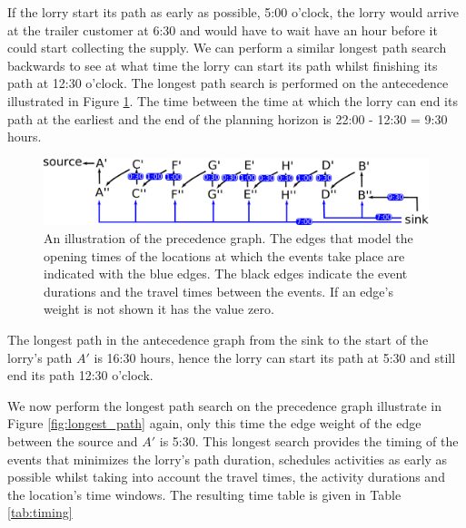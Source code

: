 If the lorry start its path as early as possible, 5:00 o'clock, the lorry would arrive at the trailer customer at 6:30 and would have to wait have an hour before it could start collecting the supply. 
We can perform a similar longest path search backwards to see at what time the lorry can start its path whilst finishing its path at 12:30 o'clock.
The longest path search is performed on the antecedence illustrated in Figure \ref{fig:antecedence}. 
The time between the time at which the lorry can end its path at the earliest and the end of the planning horizon is 22:00 - 12:30 = 9:30 hours. \\



\begin{figure}[h]
  \centering
    \includegraphics[width=1.0\textwidth]{img/backward_intro_tt.pdf}
  \caption{An illustration of the precedence graph. 
  The edges that model the opening times of the locations at which the events take place are indicated with the blue edges. 
  The black edges indicate the event durations and the travel times between the events. If an edge's weight is not shown it has the value zero. }
  \label{fig:antecedence}
\end{figure}

The longest path in the antecedence graph from the sink to the start of the lorry's path $A'$ is 16:30 hours, hence the lorry can start its path at 5:30 and still end its path 12:30 o'clock. 

We now perform the longest path search on the precedence graph illustrate in Figure \ref{fig:longest_path} again, only this time the edge weight of the edge between the source and $A'$ is 5:30. 
This longest search provides the timing of the events that minimizes the lorry's path duration, schedules activities as early as possible whilst taking into account the travel times, the activity durations and the location's time windows. 
The resulting time table is given in Table \ref{tab:timing}


